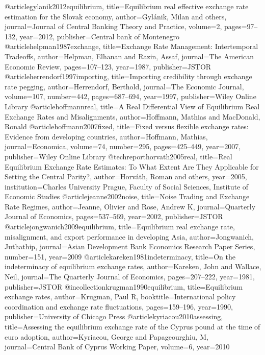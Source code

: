 @article{gylanik2012equilibrium,
  title={Equilibrium real effective exchange rate estimation for the Slovak economy},
  author={Gyl{\'a}nik, Milan and others},
  journal={Journal of Central Banking Theory and Practice},
  volume={2},
  pages={97--132},
  year={2012},
  publisher={Central bank of Montenegro}
}
@article{helpman1987exchange,
  title={Exchange Rate Management: Intertemporal Tradeoffs},
  author={Helpman, Elhanan and Razin, Assaf},
  journal={The American Economic Review},
  pages={107--123},
  year={1987},
  publisher={JSTOR}
}
@article{herrendorf1997importing,
  title={Importing credibility through exchange rate pegging},
  author={Herrendorf, Berthold},
  journal={The Economic Journal},
  volume={107},
  number={442},
  pages={687--694},
  year={1997},
  publisher={Wiley Online Library}
}
@article{hoffmannreal,
  title={A Real Differential View of Equilibrium Real Exchange Rates and Misalignments},
  author={Hoffmann, Mathias and MacDonald, Ronald}
}
@article{hoffmann2007fixed,
  title={Fixed versus flexible exchange rates: Evidence from developing countries},
  author={Hoffmann, Mathias},
  journal={Economica},
  volume={74},
  number={295},
  pages={425--449},
  year={2007},
  publisher={Wiley Online Library}
}
@techreport{horvath2005real,
  title={Real Equilibrium Exchange Rate Estimates: To What Extent Are They Applicable for Setting the Central Parity?},
  author={Horv{\'a}th, Roman and others},
  year={2005},
  institution={Charles University Prague, Faculty of Social Sciences, Institute of Economic Studies}
}
@article{jeanne2002noise,
  title={Noise Trading and Exchange Rate Regimes},
  author={Jeanne, Olivier and Rose, Andrew K},
  journal={Quarterly Journal of Economics},
  pages={537--569},
  year={2002},
  publisher={JSTOR}
}
@article{jongwanich2009equilibrium,
  title={Equilibrium real exchange rate, misalignment, and export performance in developing Asia},
  author={Jongwanich, Juthathip},
  journal={Asian Development Bank Economics Research Paper Series},
  number={151},
  year={2009}
}
@article{kareken1981indeterminacy,
  title={On the indeterminacy of equilibrium exchange rates},
  author={Kareken, John and Wallace, Neil},
  journal={The Quarterly Journal of Economics},
  pages={207--222},
  year={1981},
  publisher={JSTOR}
}
@incollection{krugman1990equilibrium,
  title={Equilibrium exchange rates},
  author={Krugman, Paul R},
  booktitle={International policy coordination and exchange rate fluctuations},
  pages={159--196},
  year={1990},
  publisher={University of Chicago Press}
}
@article{kyriacou2010assessing,
  title={Assessing the equilibrium exchange rate of the Cyprus pound at the time of euro adoption},
  author={Kyriacou, George and Papageourghiu, M},
  journal={Central Bank of Cyprus Working Paper},
  volume={6},
  year={2010}
}
